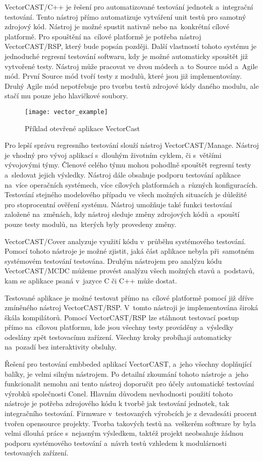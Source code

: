 VectorCAST/C++ je řešení pro automatizované testování jednotek a~integrační testování. Tento nástroj přímo automatizuje vytváření unit testů pro samotný zdrojový kód. Nástroj je možné spustit nativně nebo na~konkrétní cílové platformě. Pro spouštění na~cílové platformě je potřeba nástroj VectorCAST/RSP, který bude popsán později. Další vlastností tohoto systému je jednoduché regresní testování softwaru, kdy je možné automaticky spouštět již vytvořené testy. Nástroj může pracovat ve dvou módech a~to Source mód a~Agile mód. První Source mód tvoří testy z modulů, které jsou již implementovány. Druhý Agile mód nepotřebuje pro tvorbu testů zdrojové kódy daného modulu, ale stačí mu pouze jeho hlavičkové soubory.

\begin{figure}[h]
  \centering
  \texttt{[image: vector\_example]}
  \caption{Příklad otevřené aplikace VectorCast}
  \label{fig:vector_example}
\end{figure}

Pro lepší správu regresního testování slouží nástroj VectorCAST/Manage. Nástroj je vhodný pro vývoj aplikací s~dlouhým životním cyklem, či s~většími vývojovými týmy. Členové celého týmu mohou pohodlně spouštět regresní testy a~sledovat jejich výsledky. Nástroj dále obsahuje podporu testování aplikace na~více operačních systémech, více cílových platformách a~různých konfiguracích. Testování stejného modelového případu ve všech možných situacích je důležité pro stoprocentní ověření systému. Nástroj umožňuje také funkci testování založené na~změnách, kdy nástroj sleduje změny zdrojových kódů a~spouští pouze testy modulů, na~kterých byly provedeny změny.

VectorCAST/Cover analyzuje využití kódu v~průběhu systémového testování. Pomocí tohoto nástroje je možné zjistit, jaká část aplikace nebyla při~samotném systémovém testování testována. Druhým nástrojem pro analýzu kódu VectorCAST/MCDC můžeme provést analýzu všech možných stavů a~podstavů, kam se aplikace psaná v~jazyce C či C++ může dostat.

Testované aplikace je možné testovat přímo na~cílové platformě pomocí již dříve zmíněného nástroj VectorCAST/RSP. V~tomto nástroji je implementována široká škála kompilátorů. Pomocí VectorCAST/RSP lze stáhnout testovací postup přímo na~cílovou platformu, kde jsou všechny testy prováděny a~výsledky odeslány zpět testovacímu zařízení. Všechny kroky probíhají automaticky na~pozadí bez interaktivity obsluhy.

Řešení pro testování embbeded aplikací VectorCAST, a~jeho všechny doplňující balíky, je velmi silným nástrojem. Po detailní zkoumání tohoto nástroje a~jeho funkcionalit nemohu ani tento nástroj doporučit pro účely automatické testování výrobků společnosti Conel. Hlavním důvodem nevhodnosti použití tohoto nástroje je potřeba zdrojového kódu k tvorbě jak testování jednotek, tak integračního testování. Firmware v~testovaných výrobcích je z devadesáti procent tvořen opensource projekty. Tvorba takových testů na~veškerém software by byla velmi dlouhá práce s~nejasným výsledkem, taktéž projekt neobsahuje žádnou podporu systémového testování a~návrh testů vzhledem k modulárnosti testovaných zařízení.

